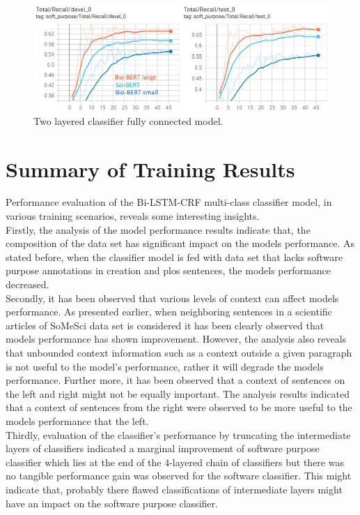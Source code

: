 \begin{figure}[htbp]
	\centering
	\includegraphics[width=.90\textwidth]{4.graphics/figures/ch_6/6.BIoBERT_vs_SCIBERT_2LAYER_Classifier/HD/1}
	\caption{Two layered classifier fully connected model.}
	\label{fig:chapter06:with}
\end{figure}

\section{Summary of Training Results }
\label{sec:chapter06:summary}

Performance evaluation of the Bi-LSTM-CRF multi-class classifier model, in various training scenarios, reveals some interesting insights. \\

Firstly, the analysis of the model performance results indicate that, the composition of the data set has significant impact on the models performance. As stated before, when the classifier model is fed with data set that lacks software purpose annotations in creation and plos sentences, the models performance decreased. \\

Secondly, it has been observed that various levels of context can affect models performance. As presented earlier, when neighboring sentences in a scientific articles of SoMeSci data set is considered it has been clearly observed that models performance has shown improvement. However, the analysis also reveals that unbounded context information such as a context outside a given paragraph is not useful to the model’s performance, rather it will degrade the models performance. Further more, it has been observed that a context of sentences on the left and right might not be equally important. The analysis results indicated that a context of sentences from the right were observed to be more useful to the models performance that the left. \\

Thirdly, evaluation of the classifier’s performance by truncating the intermediate layers of classifiers indicated a marginal improvement of software purpose classifier which lies at the end of the 4-layered chain of classifiers but there was no tangible performance gain was observed for the software classifier. This might indicate that, probably there flawed classifications of intermediate layers might have an impact on the software purpose classifier. \\

